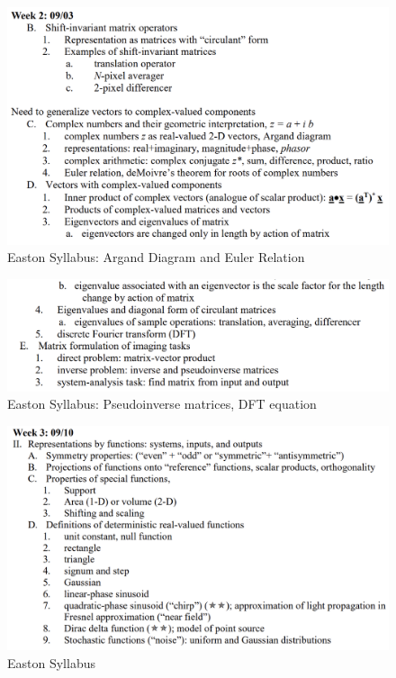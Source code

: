 \documentclass{article}
\begin{document}
\begin{figure}[h!]
\centering
\includegraphics[scale=.65]{Fourier/Week 2/Week2.1.png}
\caption{Easton Syllabus: Argand Diagram and Euler Relation}
\label{fig:Snowman4}
\end{figure}

\begin{figure}[h!]
\centering
\includegraphics[scale=.65]{Fourier/Week 2/Week2.2.png}
\caption{Easton Syllabus: Pseudoinverse matrices, DFT equation}
\label{fig:Snowman5}
\end{figure}

\begin{figure}[h!]
\centering
\includegraphics[scale=.65]{Fourier/Week 3/Week3.1.png}
\caption{Easton Syllabus}
\label{fig:Snowman6}
\end{figure}
\end{document}
